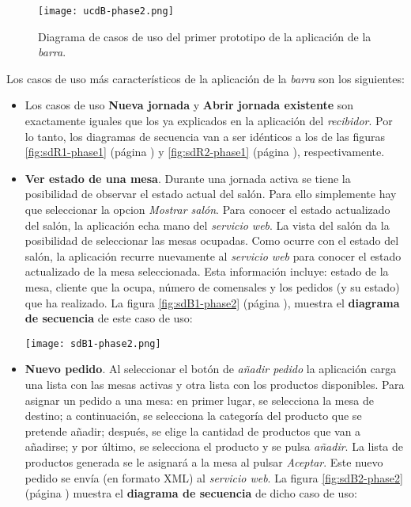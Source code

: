  \begin{figure}[H]
    \begin{center}
      \texttt{[image: ucdB-phase2.png]}
      \caption{Diagrama de casos de uso del primer prototipo de la aplicación
      de la \emph{barra}.}
      \label{fig:ucdB-phase2}
    \end{center}
  \end{figure}

Los casos de uso más característicos de la aplicación de la \emph{barra} son
los siguientes:
\begin{itemize}
\item Los casos de uso \textbf{Nueva jornada} y \textbf{Abrir jornada
existente} son exactamente iguales que los ya explicados en la aplicación
del \emph{recibidor}. Por lo tanto, los diagramas de secuencia van a ser 
idénticos a los de las figuras \ref{fig:sdR1-phase1} (página
\pageref{fig:sdR1-phase1}) y \ref{fig:sdR2-phase1} (página
\pageref{fig:sdR2-phase1}), respectivamente.
\item \textbf{Ver estado de una mesa}. Durante una jornada activa se tiene
la posibilidad de observar el estado actual del salón. Para ello simplemente
hay que seleccionar la opcion \emph{Mostrar salón}. Para conocer el estado
actualizado del salón, la aplicación echa mano del \emph{servicio web}.
La vista del salón da la posibilidad de seleccionar las mesas ocupadas. Como
ocurre con el estado del salón, la aplicación recurre nuevamente al
\emph{servicio web} para conocer el estado actualizado de la mesa seleccionada.
Esta información incluye: estado de la mesa, cliente que la ocupa, número
de comensales y los pedidos (y su estado) que ha realizado. La figura
\ref{fig:sdB1-phase2} (página \pageref{fig:sdB1-phase2}), muestra el
\textbf{diagrama de secuencia} de este caso de uso:

  \begin{sidewaysfigure}[h]
    \begin{center}
      \texttt{[image: sdB1-phase2.png]}
      \caption{Diagrama de secuencia del caso de uso \emph{Ver estado de
      una mesa}.}
      \label{fig:sdB1-phase2}
    \end{center}
  \end{sidewaysfigure}

\item \textbf{Nuevo pedido}. Al seleccionar el botón de \emph{añadir pedido}
la aplicación carga una lista con las mesas activas y otra lista con los
productos disponibles. Para asignar un pedido a una mesa: en primer lugar, se
selecciona la mesa de destino; a continuación, se selecciona la categoría
del producto que se pretende añadir; después, se elige la cantidad de
productos que van a añadirse; y por último, se selecciona el producto y se
pulsa \emph{añadir}. La lista de productos generada se le asignará a la mesa
al pulsar \emph{Aceptar}. Este nuevo pedido se envía (en formato \acs{XML})
al \emph{servicio web}. La figura \ref{fig:sdB2-phase2} (página
\pageref{fig:sdB2-phase2}) muestra el \textbf{diagrama de secuencia} de dicho
caso de uso:


\end{itemize}
